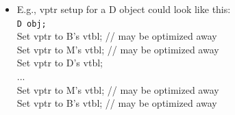 \begin{minipage}{0.7\linewidth}
\begin{itemize}
  \item E.g., vptr setup for a D object could look like this:\\
    \lstinline{D obj;}\\
    Set vptr to B's vtbl; // may be optimized away\\
    Set vptr to M's vtbl; // may be optimized away\\
    Set vptr to D's vtbl;\\
    ...\\
    Set vptr to M's vtbl; // may be optimized away\\
    Set vptr to B's vtbl; // may be optimized away
\end{itemize}
\end{minipage}%
